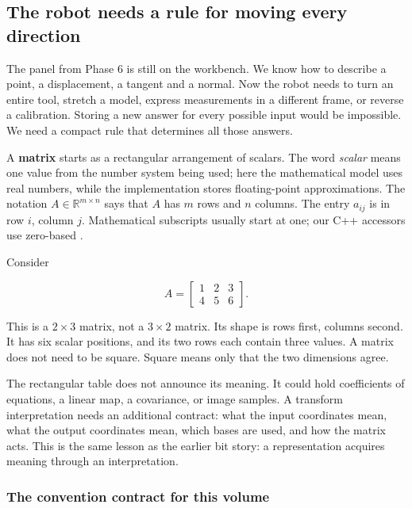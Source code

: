 \subsection{The robot needs a rule for moving every direction}\label{01-foundations-i-ch018-the-robot-needs-a-rule-for-moving-every-direction}

\hypertarget{01-foundations-i-ch018-the-robot-needs-a-rule-for-moving-every-direction}{}

The panel from Phase 6 is still on the workbench. We know how to describe a point, a displacement, a tangent and a normal. Now the robot needs to turn an entire tool, stretch a model, express measurements in a different frame, or reverse a calibration. Storing a new answer for every possible input would be impossible. We need a compact rule that determines all those answers.

A \textbf{matrix} starts as a rectangular arrangement of scalars. The word \emph{scalar} means one value from the number system being used; here the mathematical model uses real numbers, while the implementation stores floating-point approximations. The notation \(A\in\mathbb R^{m\times n}\) says that \(A\) has \(m\) rows and \(n\) columns. The entry \(a_{ij}\) is in row \(i\), column \(j\). Mathematical subscripts usually start at one; our C++ accessors use zero-based .

Consider

\[
A=\begin{bmatrix}1&2&3\\4&5&6\end{bmatrix}.
\]

This is a \(2\times3\) matrix, not a \(3\times2\) matrix. Its shape is rows first, columns second. It has six scalar positions, and its two rows each contain three values. A matrix does not need to be square. Square means only that the two dimensions agree.

The rectangular table does not announce its meaning. It could hold coefficients of equations, a linear map, a covariance, or image samples. A transform interpretation needs an additional contract: what the input coordinates mean, what the output coordinates mean, which bases are used, and how the matrix acts. This is the same lesson as the earlier bit story: a representation acquires meaning through an interpretation.

\subsubsection{The convention contract for this volume}\label{01-foundations-i-ch018-the-convention-contract-for-this-volume}

